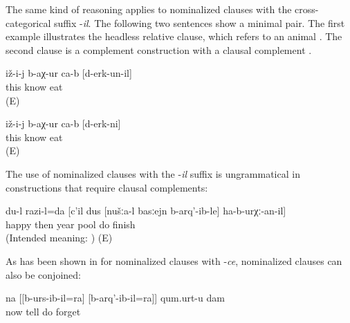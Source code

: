 The same kind of reasoning applies to nominalized clauses with the cross-categorical suffix -\textit{il}. The following two sentences show a minimal pair. The first example illustrates the headless relative clause, which refers to an animal . The second clause is a complement construction with a clausal complement . 
%
\begin{exe}
	\ex	\label{ex:He learned that they ate them}
	\begin{xlist}
			\ex	\label{ex:He got to know who ate (them)@B}
		\gll	iž-i-j	b-aχ-ur	ca-b	[d-erk-un-il]\\
			this	know		eat\\
		\glt	{} (E)
		
		\ex	\label{ex:He got to know that (they) ate (them)@A}
		\gll	iž-i-j	b-aχ-ur	ca-b	[d-erk-ni]\\
			this	know		eat\\
		\glt	{} (E)
	\end{xlist}
\end{exe}

The use of nominalized clauses with the -\textit{il} suffix is ungrammatical in constructions that require clausal complements:

\begin{exe}

	\ex	\label{ex:‎‎‎I am happy that during the next year we will finish building the pool}
	\gll	{*} du-l		razi-l=da		[c'il	dus	[nušːa-l	basːejn	b-arq'-ib-le]	ha-b-urχː-an-il]\\
		{} 	happy	then	year		pool	do	finish \\
	\glt	(Intended meaning: ) (E)
\end{exe}

As has been shown in  for nominalized clauses with -\textit{ce}, nominalized clauses can also be conjoined:

%
\begin{exe}
	\ex	\label{ex:‎I forget what I say and what I do}
	\gll	na	[[b-urs-ib-il=ra]	[b-arq'-ib-il=ra]]	qum.urt-u	dam\\
		now	tell	do	forget	\\
	\glt	{}
\end{exe}


